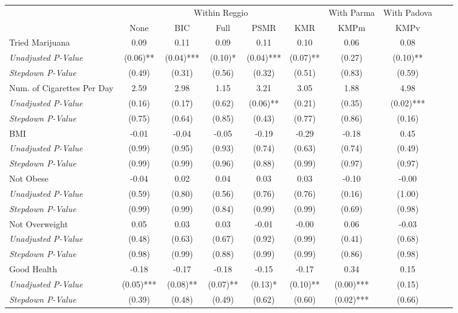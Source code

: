 \begin{tabular}{l c c c c c c c c c}
\toprule
& \multicolumn{5}{c}{Within Reggio} & With Parma & With Padova \\\cmidrule(lr){2-6} \cmidrule(lr){7} \cmidrule(lr){8}
 & None & BIC & Full & PSMR & KMR & KMPm & KMPv \\
\midrule
Tried Marijuana & 0.09 & 0.11 & 0.09 & 0.11 & 0.10 & 0.06 & 0.08 \\
\quad \textit{Unadjusted P-Value} & (0.06)** & (0.04)*** & (0.10)* & (0.04)*** & (0.07)** & (0.27) & (0.10)** \\
\quad \textit{Stepdown P-Value} & (0.49) & (0.31) & (0.56) & (0.32) & (0.51) & (0.83) & (0.59) \\
Num. of Cigarettes Per Day & 2.59 & 2.98 & 1.15 & 3.21 & 3.05 & 1.88 & 4.98 \\
\quad \textit{Unadjusted P-Value} & (0.16) & (0.17) & (0.62) & (0.06)** & (0.21) & (0.35) & (0.02)*** \\
\quad \textit{Stepdown P-Value} & (0.75) & (0.64) & (0.85) & (0.43) & (0.77) & (0.86) & (0.16) \\
BMI & -0.01 & -0.04 & -0.05 & -0.19 & -0.29 & -0.18 & 0.45 \\
\quad \textit{Unadjusted P-Value} & (0.99) & (0.95) & (0.93) & (0.74) & (0.63) & (0.74) & (0.49) \\
\quad \textit{Stepdown P-Value} & (0.99) & (0.99) & (0.96) & (0.88) & (0.99) & (0.97) & (0.97) \\
Not Obese & -0.04 & 0.02 & 0.04 & 0.03 & 0.03 & -0.10 & -0.00 \\
\quad \textit{Unadjusted P-Value} & (0.59) & (0.80) & (0.56) & (0.76) & (0.76) & (0.16) & (1.00) \\
\quad \textit{Stepdown P-Value} & (0.99) & (0.99) & (0.84) & (0.99) & (0.99) & (0.69) & (0.98) \\
Not Overweight & 0.05 & 0.03 & 0.03 & -0.01 & -0.00 & 0.06 & -0.03 \\
\quad \textit{Unadjusted P-Value} & (0.48) & (0.63) & (0.67) & (0.92) & (0.99) & (0.41) & (0.68) \\
\quad \textit{Stepdown P-Value} & (0.98) & (0.99) & (0.88) & (0.99) & (0.99) & (0.86) & (0.98) \\
Good Health & -0.18 & -0.17 & -0.18 & -0.15 & -0.17 & 0.34 & 0.15 \\
\quad \textit{Unadjusted P-Value} & (0.05)*** & (0.08)** & (0.07)** & (0.13)* & (0.10)** & (0.00)*** & (0.15) \\
\quad \textit{Stepdown P-Value} & (0.39) & (0.48) & (0.49) & (0.62) & (0.60) & (0.02)*** & (0.66) \\

\end{tabular}
